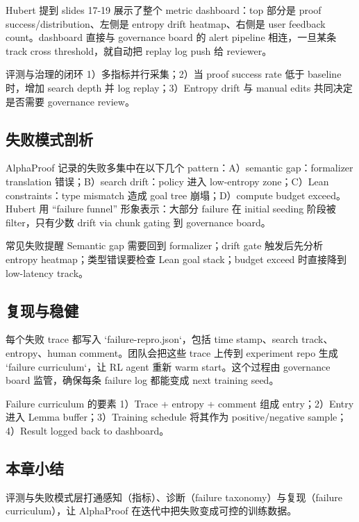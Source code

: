 \documentclass[a4paper]{article}
\begin{document}
Hubert 提到 slides 17-19 展示了整个 metric dashboard：top 部分是 proof success/distribution、左侧是 entropy drift heatmap、右侧是 user feedback count。dashboard 直接与 governance board 的 alert pipeline 相连，一旦某条 track cross threshold，就自动把 replay log push 给 reviewer。

\begin{importantbox}{评测与治理的闭环}
1）多指标并行采集；2）当 proof success rate 低于 baseline 时，增加 search depth 并 log replay；3）Entropy drift 与 manual edits 共同决定是否需要 governance review。
\end{importantbox}

\subsection{失败模式剖析}
AlphaProof 记录的失败多集中在以下几个 pattern：A）semantic gap：formalizer translation 错误；B）search drift：policy 进入 low-entropy zone；C）Lean constraints：type mismatch 造成 goal tree 崩塌；D）compute budget exceed。Hubert 用 “failure funnel” 形象表示：大部分 failure 在 initial seeding 阶段被 filter，只有少数 drift via chunk gating 到 governance board。

\begin{warningbox}{常见失败提醒}
Semantic gap 需要回到 formalizer；drift gate 触发后先分析 entropy heatmap；类型错误要检查 Lean goal stack；budget exceed 时直接降到 low-latency track。
\end{warningbox}

\subsection{复现与稳健}
每个失败 trace 都写入 `failure-repro.json`，包括 time stamp、search track、entropy、human comment。团队会把这些 trace 上传到 experiment repo 生成 `failure curriculum`，让 RL agent 重新 warm start。这个过程由 governance board 监管，确保每条 failure log 都能变成 next training seed。

\begin{knowledgebox}{Failure curriculum 的要素}
1）Trace + entropy + comment 组成 entry；2）Entry 进入 Lemma buffer；3）Training schedule 将其作为 positive/negative sample；4）Result logged back to dashboard。
\end{knowledgebox}

\subsection{本章小结}
评测与失败模式层打通感知（指标）、诊断（failure taxonomy）与复现（failure curriculum），让 AlphaProof 在迭代中把失败变成可控的训练数据。
\newpage
\end{document}
